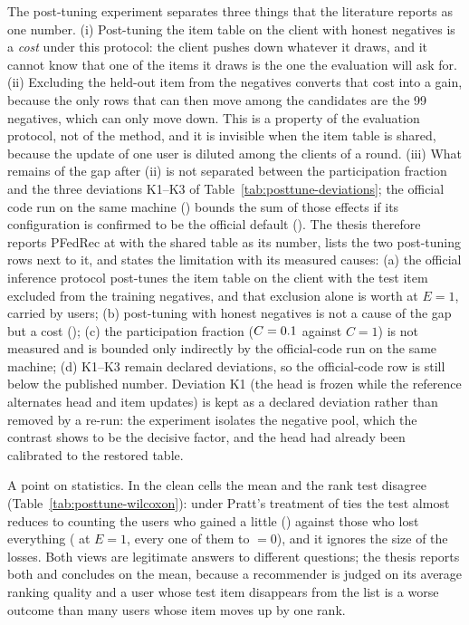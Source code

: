 The post-tuning experiment separates three things that the literature reports as one number.
(i) Post-tuning the item table on the client with honest negatives is a \emph{cost} under this
protocol: the client pushes down whatever it draws, and it cannot know that one of the items it
draws is the one the evaluation will ask for. (ii) Excluding the held-out item from the
negatives converts that cost into a gain, because the only rows that can then move among the
candidates are the 99 negatives, which can only move down. This is a property of the evaluation
protocol, not of the method, and it is invisible when the item table is shared, because the
update of one user is diluted among the \ClientsPerRound{} clients of a round. (iii) What
remains of the gap after (ii) is not separated between the participation fraction and the three
deviations K1--K3 of Table~\ref{tab:posttune-deviations}; the official code run on the same
machine (\OfficialCodeNdcg) bounds the sum of those effects if its configuration is confirmed
to be the official default (). The thesis therefore reports PFedRec at
\NdcgPfedrec{} with the shared table as its number, lists the two post-tuning rows next to it,
and states the limitation with its measured causes: (a) the official inference protocol
post-tunes the item table on the client with the test item excluded from the training negatives,
and that exclusion alone is worth \PtContrastEOne{} \ndcg{} at $E=1$, carried by
\PtContrastEOneNonZero{} users; (b) post-tuning with honest negatives is not a cause of the gap
but a cost (\PtDeltaEOneClean); (c) the participation fraction ($C=0.1$ against
$C=1$) is not measured and is bounded only indirectly by the official-code run on the same
machine; (d) K1--K3 remain declared deviations, so the official-code row is still
\GapLeakyEOneToPublished{} below the published number. Deviation K1 (the head is frozen while
the reference alternates head and item updates) is kept as a declared deviation rather than
removed by a re-run: the experiment isolates the negative pool, which the contrast shows to be
the decisive factor, and the head had already been calibrated to the restored table.

A point on statistics. In the clean cells the mean and the rank test disagree
(Table~\ref{tab:posttune-wilcoxon}): under Pratt's treatment of ties the test almost reduces to
counting the users who gained a little (\PtNPosEOneClean) against those who lost everything
(\PtNNegEOneClean{} at $E=1$, every one of them to \ndcg{} $=0$), and it ignores the size of
the losses. Both views are legitimate answers to different questions; the thesis reports both
and concludes on the mean, because a recommender is judged on its average ranking quality and
a user whose test item disappears from the list is a worse outcome than many users whose item
moves up by one rank.

